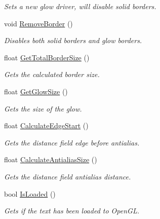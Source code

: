 \begin{DoxyCompactItemize}
\begin{DoxyCompactList}\small\item\em Sets a new glow driver, will disable solid borders. \end{DoxyCompactList}\item 
void \hyperlink{class_flounder_1_1_text_a499012b71bd5a65b47ead39cd319460b}{Remove\+Border} ()
\begin{DoxyCompactList}\small\item\em Disables both solid borders and glow borders. \end{DoxyCompactList}\item 
float \hyperlink{class_flounder_1_1_text_a3e0dbe3cd70c7c66de11d336d2268870}{Get\+Total\+Border\+Size} ()
\begin{DoxyCompactList}\small\item\em Gets the calculated border size. \end{DoxyCompactList}\item 
float \hyperlink{class_flounder_1_1_text_af1c0f4c529861a46a0738ad01c4e5d09}{Get\+Glow\+Size} ()
\begin{DoxyCompactList}\small\item\em Gets the size of the glow. \end{DoxyCompactList}\item 
float \hyperlink{class_flounder_1_1_text_a5297a7da9cc3d2b3aa4ee531f52b3c20}{Calculate\+Edge\+Start} ()
\begin{DoxyCompactList}\small\item\em Gets the distance field edge before antialias. \end{DoxyCompactList}\item 
float \hyperlink{class_flounder_1_1_text_ad4f499c40bd689fe5316b9669276f0da}{Calculate\+Antialias\+Size} ()
\begin{DoxyCompactList}\small\item\em Gets the distance field antialias distance. \end{DoxyCompactList}\item 
bool \hyperlink{class_flounder_1_1_text_aa4d02bdfca1c5139fd30761065657f9b}{Is\+Loaded} ()
\begin{DoxyCompactList}\small\item\em Gets if the text has been loaded to Open\+GL. \end{DoxyCompactList}\end{DoxyCompactItemize}
